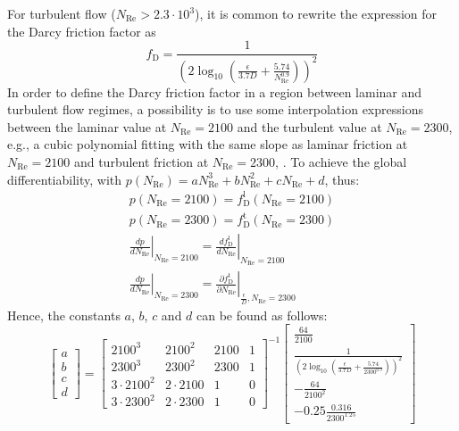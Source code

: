 \documentclass[%
]{USN-PhD}
\begin{document}
For turbulent flow ($N_\mathrm{Re} > 2.3\cdot10^3$), it is common to rewrite the expression for the Darcy friction factor as
\begin{equation}\label{eq:eq3}
f_\mathrm{D}=\frac{1}{\left(2\log_{10} \left(\frac{\epsilon}{3.7D} + \frac{5.74}{N_\mathrm{Re}^{0.9}}\right)\right)^ 2}
\end{equation}
In order to define the Darcy friction factor in a region between laminar and turbulent flow regimes, a possibility is to use some interpolation expressions between the laminar value at $N_\mathrm{Re}=2100$ and the turbulent value at $N_\mathrm{Re}= 2300$, e.g., a cubic polynomial fitting with the same slope as laminar friction at $N_\mathrm{Re}=2100$ and turbulent friction at $N_\mathrm{Re}=2300$, \cite{LieL:18}. To achieve the global differentiability, with $p(N_\mathrm{Re})=aN_\mathrm{Re}^3+bN_\mathrm{Re}^2+cN_\mathrm{Re}+d$, thus:
\begin{equation}
\begin{array}{c}
p(N_\mathrm{Re}=2100)=f_\mathrm{D}^\mathrm{l}(N_\mathrm{Re}=2100)\\
p(N_\mathrm{Re}=2300)=f_\mathrm{D}^\mathrm{t}(N_\mathrm{Re}=2300)\\
\left.\frac{dp}{dN_\mathrm{Re}}\right\rvert_{N_\mathrm{Re}=2100}=\left.\frac{df_\mathrm{D}^\mathrm{l}}{dN_\mathrm{Re}}\right\rvert_{N_\mathrm{Re}=2100}\\
\left.\frac{dp}{dN_\mathrm{Re}}\right\rvert_{N_\mathrm{Re}=2300}=\left.\frac{\partial f_\mathrm{D}^\mathrm{t}}{\partial N_\mathrm{Re}}\right\rvert_{\frac{\epsilon}{D},N_\mathrm{Re}=2300}
\end{array}
\end{equation}
Hence, the constants $a$, $b$, $c$ and $d$ can be found as follows:
\begin{equation}\label{eq:eq4}
\begin{bmatrix}a\\b\\c\\d \end{bmatrix}=
\begin{bmatrix}2100^3&2100^2 & 2100& 1\\ 2300^3 & 2300^2 & 2300 & 1\\ 3\cdot2100^2 & 2\cdot2100& 1 & 0\\ 3\cdot2300^2 & 2\cdot2300 &1 & 0\end{bmatrix}^{-1}
\begin{bmatrix} \frac{64}{2100} \\ \frac{1}{\left(2\log_{10}\left(\frac{\epsilon}{3.7D}+\frac{5.74}{2300^ {0.9}}\right)\right)^2} \\ -\frac{64}{2100^ 2} \\ -0.25\frac{0.316}{2300^{1.25}} \end{bmatrix}
\end{equation}
\end{document}
